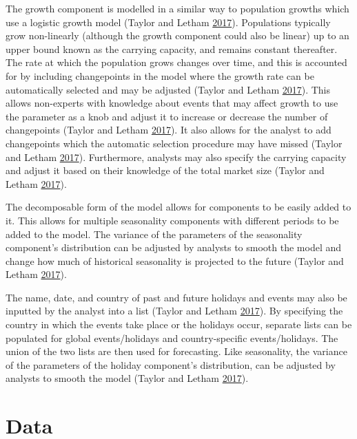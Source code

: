 \documentclass[12pt,preprint, authoryear]{elsarticle}
\numberwithin{equation}{section}
\numberwithin{figure}{section}
\numberwithin{table}{section}
\begin{document}
The growth component is modelled in a similar way to population growths
which use a logistic growth model (Taylor and Letham
\protect\hyperlink{ref-taylor2017}{2017}). Populations typically grow
non-linearly (although the growth component could also be linear) up to
an upper bound known as the carrying capacity, and remains constant
thereafter. The rate at which the population grows changes over time,
and this is accounted for by including changepoints in the model where
the growth rate can be automatically selected and may be adjusted
(Taylor and Letham \protect\hyperlink{ref-taylor2017}{2017}). This
allows non-experts with knowledge about events that may affect growth to
use the parameter as a knob and adjust it to increase or decrease the
number of changepoints (Taylor and Letham
\protect\hyperlink{ref-taylor2017}{2017}). It also allows for the
analyst to add changepoints which the automatic selection procedure may
have missed (Taylor and Letham
\protect\hyperlink{ref-taylor2017}{2017}). Furthermore, analysts may
also specify the carrying capacity and adjust it based on their
knowledge of the total market size (Taylor and Letham
\protect\hyperlink{ref-taylor2017}{2017}).

The decomposable form of the model allows for components to be easily
added to it. This allows for multiple seasonality components with
different periods to be added to the model. The variance of the
parameters of the seasonality component's distribution can be adjusted
by analysts to smooth the model and change how much of historical
seasonality is projected to the future (Taylor and Letham
\protect\hyperlink{ref-taylor2017}{2017}).

The name, date, and country of past and future holidays and events may
also be inputted by the analyst into a list (Taylor and Letham
\protect\hyperlink{ref-taylor2017}{2017}). By specifying the country in
which the events take place or the holidays occur, separate lists can be
populated for global events/holidays and country-specific
events/holidays. The union of the two lists are then used for
forecasting. Like seasonality, the variance of the parameters of the
holiday component's distribution, can be adjusted by analysts to smooth
the model (Taylor and Letham \protect\hyperlink{ref-taylor2017}{2017}).

\section{\texorpdfstring{Data \label{Data}}{Data }}\label{data}
\end{document}
